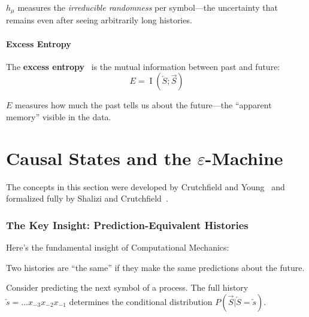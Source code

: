 \documentclass[11pt,a4paper]{article}
\theoremstyle{definition}
\theoremstyle{plain}
\newcommand{\eps}{\varepsilon}
\newcommand{\hmu}{h_\mu}
\newcommand{\Past}{\overleftarrow{S}}
\newcommand{\Future}{\overrightarrow{S}}
\newcommand{\past}{\overleftarrow{s}}
\DeclareMathOperator{\MI}{I}
\begin{document}
\begin{intuition}
$\hmu$ measures the \emph{irreducible randomness} per symbol---the uncertainty that remains even after seeing arbitrarily long histories.
\end{intuition}

\subsection{Excess Entropy}

The \textbf{excess entropy}~\cite{grassberger1986toward} is the mutual information between past and future:
\begin{equation}
    E = \MI(\Past; \Future)
\end{equation}

\begin{intuition}
$E$ measures how much the past tells us about the future---the ``apparent memory'' visible in the data.
\end{intuition}

\part{\texorpdfstring{Causal States and the $\eps$-Machine}{Causal States and the Epsilon-Machine}}

The concepts in this section were developed by Crutchfield and Young~\cite{crutchfield1989inferring} and formalized fully by Shalizi and Crutchfield~\cite{shalizi2001computational}.

\section{The Key Insight: Prediction-Equivalent Histories}
\label{sec:key-insight}

Here's the fundamental insight of Computational Mechanics:

\begin{keyidea}
Two histories are ``the same'' if they make the same predictions about the future.
\end{keyidea}

Consider predicting the next symbol of a process. The full history $\past = \ldots x_{-3} x_{-2} x_{-1}$ determines the conditional distribution $P(\Future | \Past = \past)$.
\end{document}
